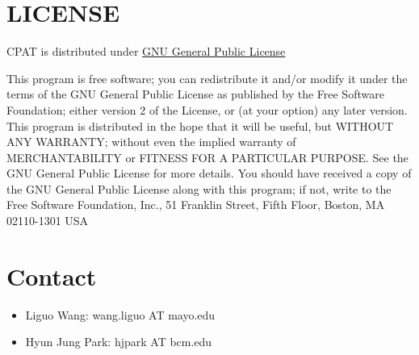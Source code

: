 \documentclass[letterpaper,10pt,english]{sphinxmanual}
\begin{document}
\begin{figure}[htbp]
\centering

\end{figure}


\chapter{LICENSE}
\label{index:license}
CPAT is distributed under \href{http://www.gnu.org/copyleft/gpl.html}{GNU General Public License}

This program is free software; you can redistribute it and/or
modify it under the terms of the GNU General Public License as
published by the Free Software Foundation; either version 2 of the
License, or (at your option) any later version. This program is distributed in the hope that it will be useful,
but WITHOUT ANY WARRANTY; without even the implied warranty of
MERCHANTABILITY or FITNESS FOR A PARTICULAR PURPOSE.  See the GNU
General Public License for more details. You should have received a copy of the GNU General Public License
along with this program; if not, write to the Free Software
Foundation, Inc., 51 Franklin Street, Fifth Floor, Boston, MA
02110-1301 USA


\chapter{Contact}
\label{index:contact}\begin{itemize}
\item {} 
Liguo Wang: wang.liguo AT mayo.edu

\item {} 
Hyun Jung Park: hjpark AT bcm.edu

\end{itemize}



\renewcommand{\indexname}{Index}
\printindex
\end{document}
